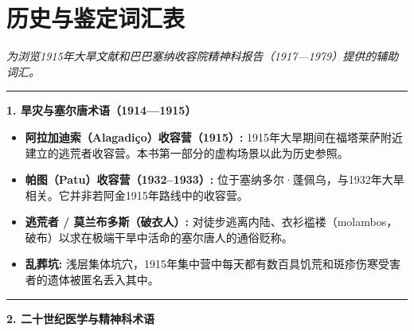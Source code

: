 \cleardoublepage
\thispagestyle{empty}
\chapter*{历史与鉴定词汇表}

\begingroup

\noindent\textit{为浏览1915年大旱文献和巴巴塞纳收容院精神科报告（1917—1979）提供的辅助词汇。}

\vspace{0.8em}
\noindent\rule{\textwidth}{0.8pt}
\vspace{0.6em}

\noindent\textbf{1. 旱灾与塞尔唐术语（1914—1915）}

\vspace{0.4em}
\begin{itemize}[itemsep=0.2em]
  \item \textbf{阿拉加迪索（Alagadiço）收容营（1915）:} 1915年大旱期间在福塔莱萨附近建立的逃荒者收容营。本书第一部分的虚构场景以此为历史参照。
  \item \textbf{帕图（Patu）收容营（1932--1933）:} 位于塞纳多尔·蓬佩乌，与1932年大旱相关。它并非若阿金1915年路线中的收容营。
  \item \textbf{逃荒者 / 莫兰布多斯（破衣人）:} 对徒步逃离内陆、衣衫褴褛（molambos，破布）以求在极端干旱中活命的塞尔唐人的通俗贬称。
  \item \textbf{乱葬坑:} 浅层集体坑穴，1915年集中营中每天都有数百具饥荒和斑疹伤寒受害者的遗体被匿名丢入其中。
\end{itemize}

\vspace{0.8em}
\noindent\rule{\textwidth}{0.5pt}
\vspace{0.6em}

\noindent\textbf{2. 二十世纪医学与精神科术语}

